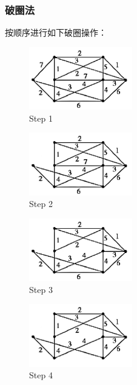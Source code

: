 \subsubsection{破圈法}
按顺序进行如下破圈操作：
\begin{figure}[H]
    \centering
    \includegraphics[width=0.4\textwidth]{./hw9_image/1.png}
    \caption{Step 1}
    \label{fig:Chapter4_Temporary_Pavilion_1}
\end{figure}
\begin{figure}[H]
    \centering
    \includegraphics[width=0.4\textwidth]{./hw9_image/2.png}
    \caption{Step 2}
    \label{fig:Chapter4_Temporary_Pavilion_1}
\end{figure}
\begin{figure}[H]
    \centering
    \includegraphics[width=0.4\textwidth]{./hw9_image/3.png}
    \caption{Step 3}
    \label{fig:Chapter4_Temporary_Pavilion_1}
\end{figure}
\begin{figure}[H]
    \centering
    \includegraphics[width=0.4\textwidth]{./hw9_image/4.png}
    \caption{Step 4}
    \label{fig:Chapter4_Temporary_Pavilion_1}
\end{figure}
